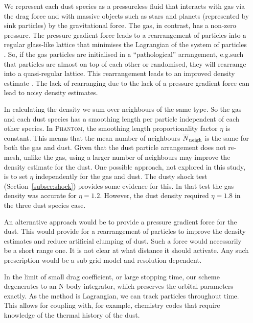 \documentclass[fleqn,usenatbib]{mnras}
\begin{document}
We represent each dust species as a pressureless fluid that interacts with gas
via the drag force and with massive objects such as stars and planets
(represented by sink particles) by the gravitational force. The gas, in
contrast, has a non-zero pressure. The pressure gradient force leads to a
rearrangement of particles into a regular glass-like lattice
\citep{Monaghan2005RPPh...68.1703M} that minimises the Lagrangian of the system
of particles \citep{Price2012JCoPh.231..759P}. So, if the gas particles are
initialised in a ``pathological'' arrangement, e.g.\@ such that particles are
almost on top of each other or randomised, they will rearrange into a
quasi-regular lattice. This rearrangement leads to an improved density estimate
\citep{Price2012JCoPh.231..759P}. The lack of rearranging due to the lack of a
pressure gradient force can lead to noisy density estimates.

In calculating the density we sum over neighbours of the same type. So the gas
and each dust species has a smoothing length per particle independent of each
other species. In \textsc{Phantom}, the smoothing length proportionality factor
\(\eta\) is constant. This means that the mean number of neighbours
\(\overline{N}_{\rm neigh}\) is the same for both the gas and dust. Given that
the dust particle arrangement does not re-mesh, unlike the gas, using a larger
number of neighbours may improve the density estimate for the dust. One possible
approach, not explored in this study, is to set \(\eta\) independently for the
gas and dust. The dusty shock test (Section~\ref{subsec:shock}) provides some
evidence for this. In that test the gas density was accurate for \(\eta = 1.2\).
However, the dust density required \(\eta = 1.8\) in the three dust species
case.

An alternative approach would be to provide a pressure gradient force for the
dust. This would provide for a rearrangement of particles to improve the density
estimates and reduce artificial clumping of dust. Such a force would necessarily
be a short range one. It is not clear at what distance it should activate. Any
such prescription would be a sub-grid model and resolution dependent.

In the limit of small drag coefficient, or large stopping time, our scheme
degenerates to an N-body integrator, which preserves the orbital parameters
exactly. As the method is Lagrangian, we can track particles throughout time.
This allows for coupling with, for example, chemistry codes that require
knowledge of the thermal history of the dust.
\end{document}
